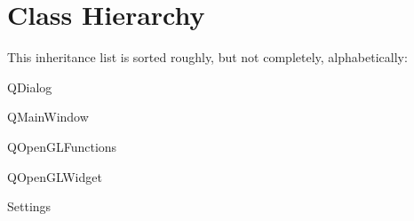 \section{Class Hierarchy}
This inheritance list is sorted roughly, but not completely, alphabetically\+:\begin{DoxyCompactList}
\item {}
\item {}
\begin{DoxyCompactList}
\item {}
\item {}
\end{DoxyCompactList}
\item Q\+Dialog\begin{DoxyCompactList}
\item {}
\end{DoxyCompactList}
\item Q\+Main\+Window\begin{DoxyCompactList}
\item {}
\end{DoxyCompactList}
\item Q\+Open\+G\+L\+Functions\begin{DoxyCompactList}
\item {}
\end{DoxyCompactList}
\item Q\+Open\+G\+L\+Widget\begin{DoxyCompactList}
\item {}
\end{DoxyCompactList}
\item Settings\begin{DoxyCompactList}
\item {}
\end{DoxyCompactList}
\end{DoxyCompactList}

